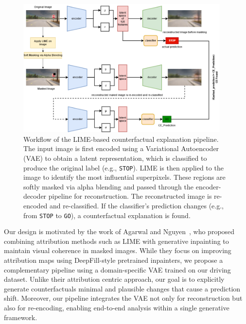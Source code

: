 \begin{figure}
    \centering
    \includegraphics[width=0.95\textwidth]{img/masking/lime_on_images/lime_on_images_based_masking_flow.drawio.png}
    \caption{
Workflow of the LIME-based counterfactual explanation pipeline. The input image is first encoded using a Variational Autoencoder (VAE) to obtain a latent representation, which is classified to produce the original label (e.g., \texttt{STOP}). LIME is then applied to the image to identify the most influential superpixels. These regions are softly masked via alpha blending and passed through the encoder-decoder pipeline for reconstruction. The reconstructed image is re-encoded and re-classified. If the classifier’s prediction changes (e.g., from \texttt{STOP} to \texttt{GO}), a counterfactual explanation is found.
}
\label{fig:lime_image_workflow}
\end{figure}

Our design is motivated by the work of Agarwal and Nguyen~\cite{agarwal2020explainingimageclassifiersremoving}, who proposed combining attribution methods such as LIME with generative inpainting to maintain visual coherence in masked images. While they focus on improving attribution maps using DeepFill-style pretrained inpainters, we propose a complementary pipeline using a domain-specific VAE trained on our driving dataset. Unlike their attribution centric approach, our goal is to explicitly generate counterfactuals minimal and plausible changes that cause a prediction shift. Moreover, our pipeline integrates the VAE not only for reconstruction but also for re-encoding, enabling end-to-end analysis within a single generative framework.


